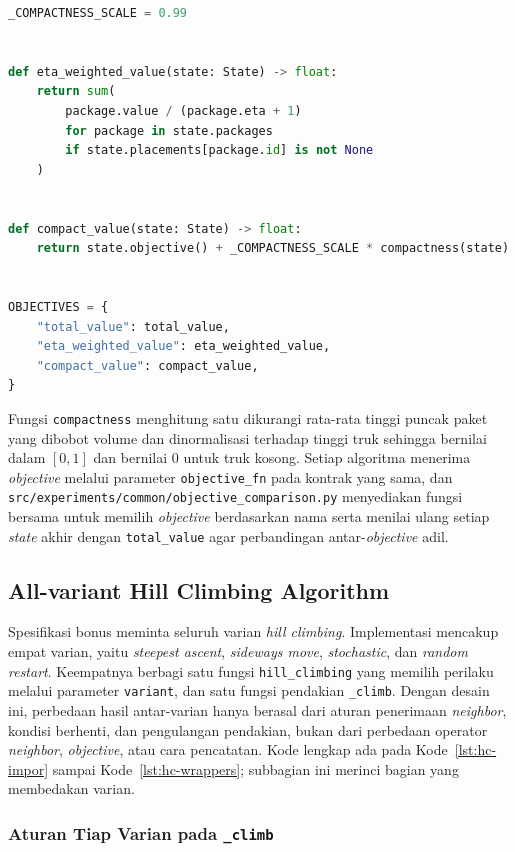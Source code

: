 \begin{lstlisting}[language=Python, caption={Fungsi \textit{objective} tambahan pada \texttt{objectives.py}}]
_COMPACTNESS_SCALE = 0.99


def eta_weighted_value(state: State) -> float:
    return sum(
        package.value / (package.eta + 1)
        for package in state.packages
        if state.placements[package.id] is not None
    )


def compact_value(state: State) -> float:
    return state.objective() + _COMPACTNESS_SCALE * compactness(state)


OBJECTIVES = {
    "total_value": total_value,
    "eta_weighted_value": eta_weighted_value,
    "compact_value": compact_value,
}
\end{lstlisting}

Fungsi \texttt{compactness} menghitung satu dikurangi rata-rata tinggi puncak paket yang dibobot volume dan dinormalisasi terhadap tinggi truk sehingga bernilai dalam $[0,1]$ dan bernilai 0 untuk truk kosong. Setiap algoritma menerima \textit{objective} melalui parameter \texttt{objective\_fn} pada kontrak yang sama, dan \texttt{src/\allowbreak experiments/\allowbreak common/\allowbreak objective\_comparison.py} menyediakan fungsi bersama untuk memilih \textit{objective} berdasarkan nama serta menilai ulang setiap \textit{state} akhir dengan \texttt{total\_value} agar perbandingan antar-\textit{objective} adil.

\subsection{All-variant Hill Climbing Algorithm}

Spesifikasi bonus meminta seluruh varian \textit{hill climbing}. Implementasi mencakup empat varian, yaitu \textit{steepest ascent}, \textit{sideways move}, \textit{stochastic}, dan \textit{random restart}. Keempatnya berbagi satu fungsi \texttt{hill\_climbing} yang memilih perilaku melalui parameter \texttt{variant}, dan satu fungsi pendakian \texttt{\_climb}. Dengan desain ini, perbedaan hasil antar-varian hanya berasal dari aturan penerimaan \textit{neighbor}, kondisi berhenti, dan pengulangan pendakian, bukan dari perbedaan operator \textit{neighbor}, \textit{objective}, atau cara pencatatan. Kode lengkap ada pada Kode~\ref{lst:hc-impor} sampai Kode~\ref{lst:hc-wrappers}; subbagian ini merinci bagian yang membedakan varian.

\subsubsection{Aturan Tiap Varian pada \texttt{\_climb}}


